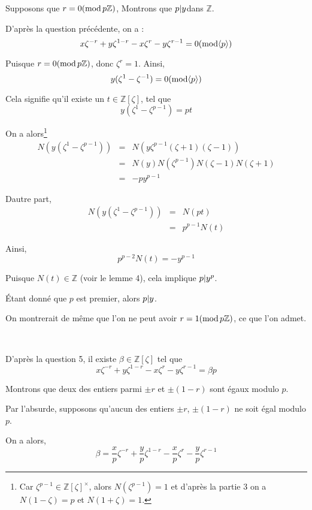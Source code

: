  Supposons que $r = 0 (\operatorname{mod} p\mathbb{Z})$, Montrons que $p
| y  $dans $\mathbb{Z}$.

D'apr{\`e}s la question pr{\'e}c{\'e}dente, on a :
\[ x \zeta^{- r} + y \zeta^{1 - r} - x \zeta^r - y \zeta^{r - 1} = 0
   (\operatorname{mod} \langle p \rangle) \]


Puisque $r = 0 (\operatorname{mod} p\mathbb{Z})$, donc $\zeta^r = 1$. Ainsi,
\[ y (\zeta^1 - \zeta^{- 1}) = 0 (\operatorname{mod} \langle p \rangle) \]


Cela signifie qu'il existe un $t \in \mathbb{Z} [\zeta]$, tel que
\[ y (\zeta^1 - \zeta^{p - 1}) = p t \]


On a alors\footnote{Car $\zeta^{p - 1} \in \mathbb{Z} [\zeta]^{\times}$, alors
$N (\zeta^{p - 1}) = 1$ et d'apr{\`e}s la partie 3 on a $N (1 - \zeta) = p$ et
$N (1 + \zeta) = 1$.}
\begin{eqnarray*}
  N (y (\zeta^1 - \zeta^{p - 1})) & = & N (y \zeta^{p - 1} (\zeta  + 1) (\zeta
  - 1))\\
  & = & N (y) N (\zeta^{p - 1}) N (\zeta - 1) N (\zeta + 1)\\
  & = & - p y^{p - 1}
\end{eqnarray*}


Dautre part,
\begin{eqnarray*}
  N (y (\zeta^1 - \zeta^{p - 1})) & = & N (p t)\\
  & = & p^{p - 1} N (t)
\end{eqnarray*}


Ainsi,
\[ p^{p - 2} N (t) = - y^{p - 1} \]


Puisque $N (t) \in \mathbb{Z}$ (voir le lemme 4), cela implique $p | y^p
$.

{\'E}tant donn{\'e} que $p$ est premier, alors $p | y $.

{\guillemotleft} On montrerait de m{\^e}me que l'on ne peut avoir $r = 1
(\operatorname{mod} p\mathbb{Z})$, ce que l'on admet. {\guillemotright}

\

 D'apr{\`e}s la question 5, il existe $\beta \in \mathbb{Z}
[\zeta]$ tel que
\[ x \zeta^{- r} + y \zeta^{1 - r} - x \zeta^r - y \zeta^{r - 1} = \beta p \]


Montrons que deux des entiers parmi $\pm r$ et $\pm (1 - r)$ sont {\'e}gaux
modulo $p$.

Par l'absurde, supposons qu'aucun des entiers $\pm r$, $\pm (1 - r)$ ne soit
{\'e}gal modulo $p$.

On a alors,
\[ \beta = \frac{x}{p} \zeta^{- r} + \frac{y}{p} \zeta^{1 - r} - \frac{x}{p}
   \zeta^r - \frac{y}{p} \zeta^{r - 1} \]


